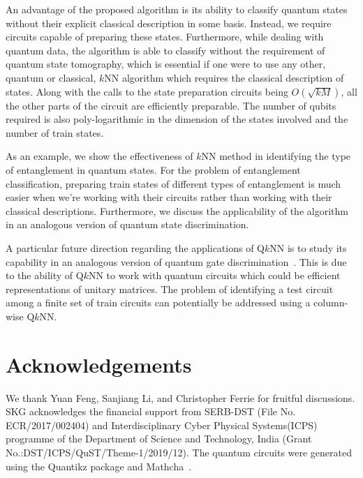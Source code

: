 \documentclass[a4paper,twocolumn,11pt,unpublished]{quantumarticle}
\begin{document}
    An advantage of the proposed algorithm is its ability to classify quantum states without their explicit classical description in some basis. Instead, we require circuits capable of preparing these states.  Furthermore, while dealing with quantum data, the algorithm is able to classify without the requirement of quantum state tomography, which is essential if one were to use any other, quantum or classical, $k$NN algorithm which requires the classical description of states. Along with the calls to the state preparation circuits being $O(\sqrt{kM})$, all the other parts of the circuit are efficiently preparable. The number of qubits required is also poly-logarithmic in the dimension of the states involved and the number of train states. 
    
    As an example, we show the effectiveness of $k$NN method in identifying the type of entanglement in quantum states. For the problem of entanglement classification, preparing train states of different types of entanglement is much easier when we're working with their circuits rather than working with their classical descriptions. Furthermore, we discuss the applicability of the algorithm in an analogous version of quantum state discrimination. 
    
    A particular future direction regarding the applications of Q$k$NN is to study its capability in an analogous version of quantum gate discrimination~\cite{Chiribella2013}. This is due to the ability of Q$k$NN to work with quantum circuits which could be efficient representations of unitary matrices. The problem of identifying a test circuit among a finite set of train circuits can potentially be addressed using a column-wise Q$k$NN.

\section{Acknowledgements}
We thank Yuan Feng, Sanjiang Li, and Christopher Ferrie for fruitful discussions. SKG acknowledges the financial support from SERB-DST (File No. ECR/2017/002404) and Interdisciplinary Cyber Physical Systems(ICPS) programme of the Department of Science and Technology, India (Grant No.:DST/ICPS/QuST/Theme-1/2019/12). The quantum circuits were generated using the Quantikz package \cite{Kay2018} and Mathcha~\cite{Mathcha}. 
\end{document}
